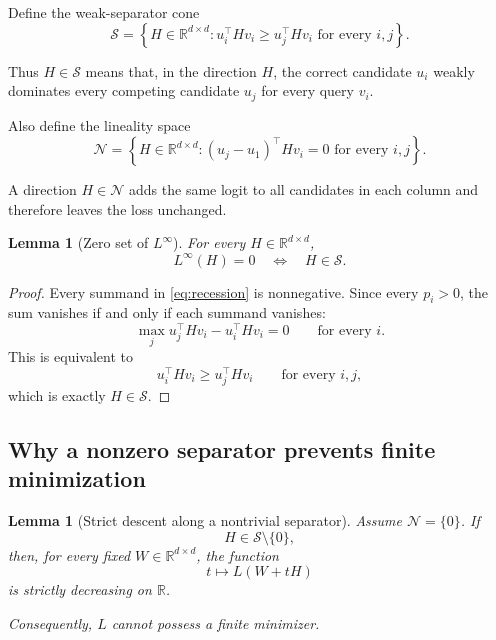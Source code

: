 \documentclass[11pt]{article}
\newtheorem{lemma}[theorem]{Lemma}
\newcommand{\R}{\mathbb{R}}
\newcommand{\cS}{\mathcal{S}}
\newcommand{\cN}{\mathcal{N}}
\newcommand{\1}{\mathbf{1}}
\begin{document}
Define the weak-separator cone
\begin{equation}
\cS
=
\left\{
H\in\R^{d\times d}:
u_i^\top Hv_i
\ge
u_j^\top Hv_i
\text{ for every }i,j
\right\}.
\label{eq:separator-cone}
\end{equation}

Thus \(H\in\cS\) means that, in the direction \(H\), the correct candidate
\(u_i\) weakly dominates every competing candidate \(u_j\) for every
query \(v_i\).

Also define the lineality space
\begin{equation}
\cN
=
\left\{
H\in\R^{d\times d}:
(u_j-u_1)^\top Hv_i=0
\text{ for every }i,j
\right\}.
\label{eq:lineality}
\end{equation}

A direction \(H\in\cN\) adds the same logit to all candidates in each
column and therefore leaves the loss unchanged.

\begin{lemma}[Zero set of \(L^\infty\)]
\label{lem:zero-set}
For every \(H\in\R^{d\times d}\),
\[
L^\infty(H)=0
\quad\Longleftrightarrow\quad
H\in\cS.
\]
\end{lemma}

\begin{proof}
Every summand in \eqref{eq:recession} is nonnegative. Since every
\(p_i>0\), the sum vanishes if and only if each summand vanishes:
\[
\max_j u_j^\top Hv_i-u_i^\top Hv_i=0
\qquad
\text{for every }i.
\]
This is equivalent to
\[
u_i^\top Hv_i
\ge
u_j^\top Hv_i
\qquad
\text{for every }i,j,
\]
which is exactly \(H\in\cS\).
\end{proof}

\subsection{Why a nonzero separator prevents finite minimization}

\begin{lemma}[Strict descent along a nontrivial separator]
\label{lem:strict-descent}
Assume \(\cN=\{0\}\). If
\[
H\in\cS\setminus\{0\},
\]
then, for every fixed \(W\in\R^{d\times d}\), the function
\[
t\longmapsto L(W+tH)
\]
is strictly decreasing on \(\R\).

Consequently, \(L\) cannot possess a finite minimizer.
\end{lemma}
\end{document}
